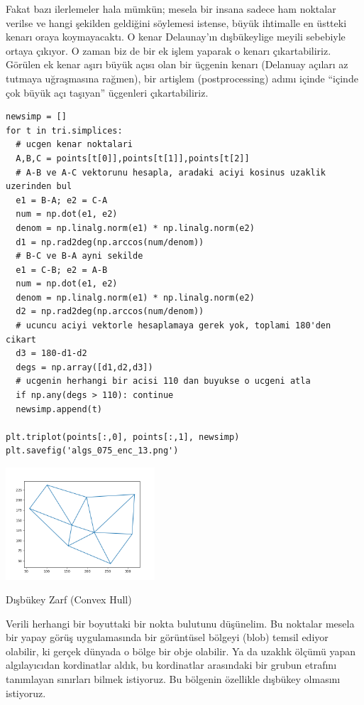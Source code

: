 \documentclass[12pt,fleqn]{article}\usepackage{../../common}
\begin{document}
Fakat bazı ilerlemeler hala mümkün; mesela bir insana sadece ham noktalar
verilse ve hangi şekilden geldiğini söylemesi istense, büyük ihtimalle en
üstteki kenarı oraya koymayacaktı. O kenar Delaunay'ın dışbükeylige meyili
sebebiyle ortaya çıkıyor. O zaman biz de bir ek işlem yaparak o kenarı
çıkartabiliriz. Görülen ek kenar aşırı büyük açısı olan bir üçgenin kenarı
(Delanuay açıları az tutmaya uğraşmasına rağmen), bir artişlem (postprocessing)
adımı içinde ``içinde çok büyük açı taşıyan'' üçgenleri çıkartabiliriz.

\begin{verbatim}
newsimp = []
for t in tri.simplices:
  # ucgen kenar noktalari
  A,B,C = points[t[0]],points[t[1]],points[t[2]]
  # A-B ve A-C vektorunu hesapla, aradaki aciyi kosinus uzaklik uzerinden bul
  e1 = B-A; e2 = C-A
  num = np.dot(e1, e2)
  denom = np.linalg.norm(e1) * np.linalg.norm(e2)
  d1 = np.rad2deg(np.arccos(num/denom))
  # B-C ve B-A ayni sekilde
  e1 = C-B; e2 = A-B
  num = np.dot(e1, e2)
  denom = np.linalg.norm(e1) * np.linalg.norm(e2)
  d2 = np.rad2deg(np.arccos(num/denom))
  # ucuncu aciyi vektorle hesaplamaya gerek yok, toplami 180'den cikart
  d3 = 180-d1-d2
  degs = np.array([d1,d2,d3])
  # ucgenin herhangi bir acisi 110 dan buyukse o ucgeni atla
  if np.any(degs > 110): continue
  newsimp.append(t)

plt.triplot(points[:,0], points[:,1], newsimp)
plt.savefig('algs_075_enc_13.png')
\end{verbatim}

\includegraphics[width=15em]{algs_075_enc_13.png}


Dışbükey Zarf (Convex Hull)

Verili herhangi bir boyuttaki bir nokta bulutunu düşünelim. Bu noktalar
mesela bir yapay görüş uygulamasında bir görüntüsel bölgeyi (blob) temsil
ediyor olabilir, ki gerçek dünyada o bölge bir obje olabilir. Ya da uzaklık
ölçümü yapan algılayıcıdan kordinatlar aldık, bu kordinatlar arasındaki bir
grubun etrafını tanımlayan sınırları bilmek istiyoruz. Bu bölgenin
özellikle dışbükey olmasını istiyoruz.
\end{document}
